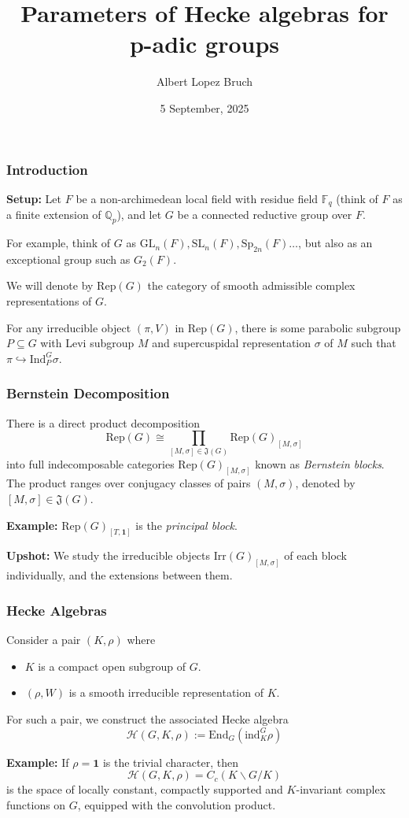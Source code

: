 \documentclass{beamer}
\title{Parameters of Hecke algebras for p-adic groups}
\author{Albert Lopez Bruch}
\date{5 September, 2025}
\newcommand{\Rep}{\mathrm{Rep}}
\newcommand{\Irr}{\mathrm{Irr}}
\newcommand{\Ind}{\mathrm{Ind}}
\newcommand{\GL}{\mathrm{GL}}
\newcommand{\SL}{\mathrm{SL}}
\newcommand{\Sp}{\mathrm{Sp}}
\newcommand{\End}{\mathrm{End}}
\newcommand{\ind}{\mathrm{ind}}
\newcommand{\QQ}{\mathbb{Q}}
\newcommand{\cH}{\mathcal{H}}
\theoremstyle{plain}
\begin{document}
\frame{\titlepage}


\begin{frame}
    \frametitle{Introduction}
    \textbf{Setup:} Let $F$ be a non-archimedean local field with residue field $\mathbb{F}_q$ (think of $F$ as a finite extension of $\QQ_p$), and let $G$ be a connected reductive group over $F$.
    \vspace{0.3cm}

    For example, think of $G$ as $\GL_n(F), \SL_n(F), \Sp_{2n}(F)\ldots$, but also as an exceptional group such as $G_2(F)$.
    \vspace{0.3cm}

    We will denote by $\Rep(G)$ the category of smooth admissible complex representations of $G$.

    \begin{fact}
        For any irreducible object $(\pi,V)$ in $\Rep(G)$, there is some parabolic subgroup $P\subseteq G$ with Levi subgroup $M$ and supercuspidal representation $\sigma$ of $M$ such that $\pi\hookrightarrow\Ind_P^G\sigma$.
    \end{fact}
\end{frame}

\begin{frame}
    \frametitle{Bernstein Decomposition}
    \begin{theorem}[Bernstein]
        There is a direct product decomposition
        \[\Rep(G)\cong \prod_{[M,\sigma]\in\mathfrak{J}(G)}\Rep(G)_{[M,\sigma]}\]
        into full indecomposable categories $\Rep(G)_{[M,\sigma]}$ known as \textit{Bernstein blocks}. The product ranges over conjugacy classes of pairs $(M,\sigma)$, denoted by $[M,\sigma]\in\mathfrak{J}(G)$.
    \end{theorem}
    \textbf{Example:} $\Rep(G)_{[T,\mathbf{1}]}$ is the \textit{principal block}.
    \vspace{0.3cm}

    \textbf{Upshot:} We study the irreducible objects $\Irr(G)_{[M,\sigma]}$ of each block individually, and the extensions between them.
\end{frame}


\begin{frame}
    \frametitle{Hecke Algebras}
    Consider a pair $(K,\rho)$ where
    \begin{itemize}
        \item $K$ is a compact open subgroup of $G$.
        \item $(\rho,W)$ is a smooth irreducible representation of $K$.
    \end{itemize}
    For such a pair, we construct the associated Hecke algebra
    \[\cH(G,K,\rho):=\End_G(\ind_K^G\rho)\]

    \textbf{Example:} If $\rho=\textbf{1}$ is the trivial character, then 
    \[\cH(G,K,\rho)=C_c(K\backslash G/K)\]
    is the space of locally constant, compactly supported and $K$-invariant complex functions on $G$, equipped with the convolution product.
    
    
\end{frame}
\end{document}

